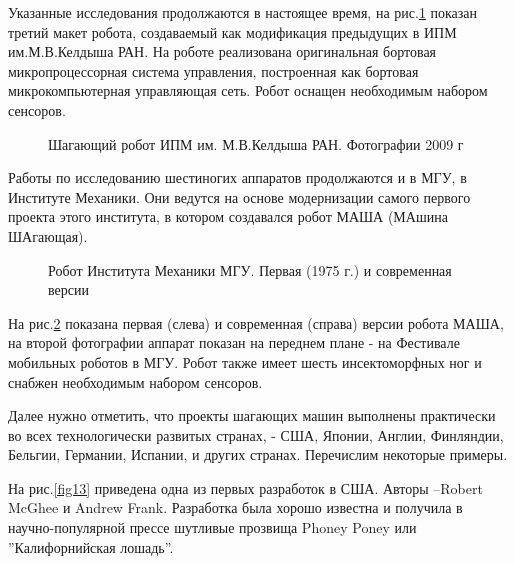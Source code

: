 Указанные исследования продолжаются в настоящее время, на рис.\ref{fig11} показан третий макет робота, создаваемый как модификация предыдущих в ИПМ им.М.В.Келдыша РАН. На роботе реализована оригинальная бортовая микропроцессорная система управления, построенная как бортовая микрокомпьютерная управляющая сеть. Робот оснащен необходимым набором сенсоров.

\begin{figure}[here]
\begin{minipage}{0.49\linewidth}
\end{minipage}
\hfill
\begin{minipage}{0.49\linewidth}
\end{minipage}
\caption{Шагающий робот ИПМ им. М.В.Келдыша РАН. 
Фотографии 2009 г}
\label{fig11}
\end{figure}
 
Работы по исследованию шестиногих аппаратов продолжаются и в МГУ, в Институте Механики. Они ведутся на основе модернизации самого первого проекта этого института, в котором создавался робот МАША (МАшина ШАгающая). 

\begin{figure}[here]
\begin{minipage}{0.49\linewidth}
\end{minipage}
\hfill
\begin{minipage}{0.49\linewidth}
\end{minipage}
\caption{Робот Института Механики МГУ. Первая (1975 г.) и современная версии}
\label{fig12}
\end{figure}
 
На рис.\ref{fig12} показана первая (слева) и современная (справа) версии робота МАША, на второй фотографии аппарат показан на переднем плане - на Фестивале мобильных роботов в МГУ. Робот также имеет шесть инсектоморфных ног и снабжен необходимым набором сенсоров.

Далее нужно отметить, что проекты шагающих машин выполнены практически во всех технологически развитых странах, - США, Японии, Англии, Финляндии, Бельгии, Германии, Испании, и других странах. Перечислим некоторые примеры. 

На рис.\ref{fig13} приведена одна из первых разработок в США. Авторы –Robert McGhee и Andrew Frank. Разработка была хорошо известна и получила в научно-популярной прессе шутливые прозвища Phoney Poney или ''Калифорнийская лошадь''.

